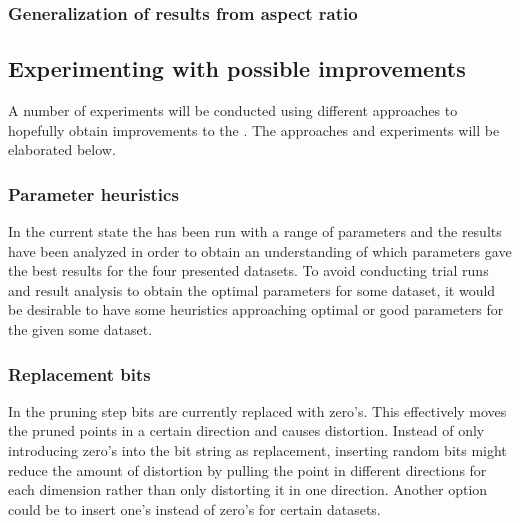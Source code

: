 \subsubsection{Generalization of results from aspect ratio}


\subsection{Experimenting with possible improvements}
A number of experiments will be conducted using different approaches to hopefully obtain improvements to the \qs{}. The approaches and experiments will be elaborated below.

\subsubsection{Parameter heuristics}
In the current state the \qs{} has been run with a range of parameters and the results have been analyzed in order to obtain an understanding of which parameters gave the best results for the four presented datasets. To avoid conducting trial runs and result analysis to obtain the optimal parameters for some dataset, it would be desirable to have some heuristics approaching optimal or good parameters for the \qs{} given some dataset.

\subsubsection{Replacement bits}
In the pruning step bits are currently replaced with zero's. This effectively moves the pruned points in a certain direction and causes distortion. Instead of only introducing zero's into the bit string as replacement, inserting random bits might reduce the amount of distortion by pulling the point in different directions for each dimension rather than only distorting it in one direction. Another option could be to insert one's instead of zero's for certain datasets. 

